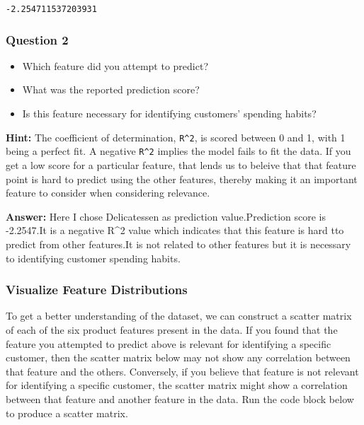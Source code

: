 \documentclass[11pt]{article}
\providecommand{\tightlist}{%
      \setlength{\itemsep}{0pt}\setlength{\parskip}{0pt}}
\begin{document}
    \begin{Verbatim}[commandchars=\\\{\}]
-2.254711537203931

    \end{Verbatim}

    \subsubsection{Question 2}\label{question-2}

\begin{itemize}
\tightlist
\item
  Which feature did you attempt to predict?
\item
  What was the reported prediction score?
\item
  Is this feature necessary for identifying customers' spending habits?
\end{itemize}

\textbf{Hint:} The coefficient of determination, \texttt{R\^{}2}, is
scored between 0 and 1, with 1 being a perfect fit. A negative
\texttt{R\^{}2} implies the model fails to fit the data. If you get a
low score for a particular feature, that lends us to beleive that that
feature point is hard to predict using the other features, thereby
making it an important feature to consider when considering relevance.

    \textbf{Answer:} Here I chose Delicatessen as prediction
value.Prediction score is -2.2547.It is a negative R\^{}2 value which
indicates that this feature is hard tto predict from other features.It
is not related to other features but it is necessary to identifying
customer spending habits.

    \subsubsection{Visualize Feature
Distributions}\label{visualize-feature-distributions}

To get a better understanding of the dataset, we can construct a scatter
matrix of each of the six product features present in the data. If you
found that the feature you attempted to predict above is relevant for
identifying a specific customer, then the scatter matrix below may not
show any correlation between that feature and the others. Conversely, if
you believe that feature is not relevant for identifying a specific
customer, the scatter matrix might show a correlation between that
feature and another feature in the data. Run the code block below to
produce a scatter matrix.
\end{document}
